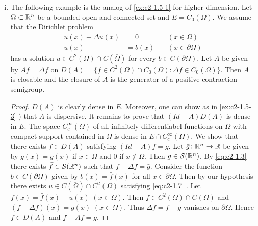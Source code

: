 \begin{examples}
\begin{enumerate}[(i)]
\item \label{ex:c2-1.5-5}
The following example is the analog of  \ref{ex:c2-1.5-1}   for higher dimension.
Let $\Omega \subset \mathbb{R}^n$ be a bounded open and connected set and $E = C_{0}(\Omega)$.
We assume that the Dirichlet problem
\begin{equation} \label{eq:c2-1.7}
\begin{array}{lll}
u(x) - \Delta u(x) &= 0 \quad &(x \in \Omega)\\
u(x) &= b(x) \quad &(x \in \partial\Omega)
\end{array}
\end{equation}
has a solution $u \in C^{2}(\Omega) \cap C(\overline{\Omega})$ for every $b \in C(\partial\Omega)$.
Let $A$ be given by $Af = \Delta f$ on
$D(A) = \{f \in C^{2}(\Omega) \cap C_{0}(\Omega) \colon \Delta f \in C_{0}(\Omega)\}$.
Then $A$ is closable and the closure of $A$ is the generator of a positive contraction semigroup.

\begin{proof}
$D(A)$ is clearly dense in $E$.
Moreover, one can show as in \ref{ex:c2-1.5-3} ) that $A$ is dispersive.
It remains to prove that $(Id - A)D(A)$ is dense in $E$.
The space $C_{c}^{\infty}(\Omega)$ of all infinitely differentiabel functions on $\Omega$ with compact support contained in $\Omega$ is dense in $E \cap C_{c}^{\infty}(\Omega)$.
We show that there exists $f \in D(A)$ satisfying $(Id - A)f = g$.
Let $\bar{g} \colon \mathbb{R}^{n} \to \mathbb{R}$ be given by $\bar{g}(x) = g(x)$ if $x \in \Omega$ and $0$ if $x \not\in \Omega$.
Then $\bar{g} \in \mathcal{S}(\mathbb{R}^n)$.
By  \eqref{eq:c2-1.3}  there exists $\bar{f} \in \mathcal{S}(\mathbb{R}^n)$ such that $\bar{f} - \Delta\bar{f} = \bar{g}$.
Consider the function $b \in C(\partial\Omega)$ given by $b(x) = \bar{f}(x)$ for all $x \in \partial\Omega$.
Then by our hypothesis there exists $u \in C(\overline{\Omega}) \cap C^{2}(\Omega)$ satisfying  \eqref{eq:c2-1.7}  .
Let $f(x) = \bar{f}(x) - u(x)$ $(x \in \Omega)$.
Then $f \in C^{2}(\Omega) \cap C(\Omega)$ and $(f - \Delta f)(x) = g(x)$ $(x \in \Omega)$.
Thus $\Delta f = f - g$ vanishes on $\partial\Omega$.
Hence $f \in D(A)$ and $f - Af = g$.
\end{proof}


\end{enumerate}
\end{examples}
